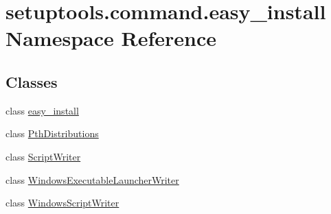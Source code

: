 \hypertarget{namespacesetuptools_1_1command_1_1easy__install}{}\section{setuptools.\+command.\+easy\+\_\+install Namespace Reference}
\label{namespacesetuptools_1_1command_1_1easy__install}
\subsection*{Classes}
\begin{DoxyCompactItemize}
\item 
class \hyperlink{classsetuptools_1_1command_1_1easy__install_1_1easy__install}{easy\+\_\+install}
\item 
class \hyperlink{classsetuptools_1_1command_1_1easy__install_1_1PthDistributions}{Pth\+Distributions}
\item 
class \hyperlink{classsetuptools_1_1command_1_1easy__install_1_1ScriptWriter}{Script\+Writer}
\item 
class \hyperlink{classsetuptools_1_1command_1_1easy__install_1_1WindowsExecutableLauncherWriter}{Windows\+Executable\+Launcher\+Writer}
\item 
class \hyperlink{classsetuptools_1_1command_1_1easy__install_1_1WindowsScriptWriter}{Windows\+Script\+Writer}
\end{DoxyCompactItemize}
